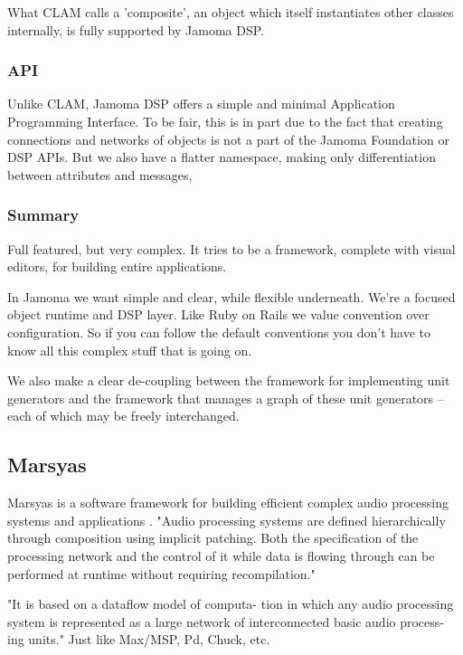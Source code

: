 \documentclass[twoside,10pt]{article}
\begin{document}
What CLAM calls a 'composite', an object which itself instantiates other classes internally, is fully supported by Jamoma DSP.


\subsubsection{API}

Unlike CLAM, Jamoma DSP offers a simple and minimal Application Programming Interface.  To be fair, this is in part due to the fact that creating connections and networks of objects is not a part of the Jamoma Foundation or DSP APIs.  But we also have a flatter namespace, making only differentiation between attributes and messages,


\subsubsection{Summary}

Full featured, but very complex.  It tries to be a framework, complete with visual editors, for building entire applications.

In Jamoma we want simple and clear, while flexible underneath.  We're a focused object runtime and DSP layer.  Like Ruby on Rails we value convention over configuration.  So if you can follow the default conventions you don't have to know all this complex stuff that is going on.

We also make a clear de-coupling between the framework for implementing unit generators and the framework that manages a graph of these unit generators -- each of which may be freely interchanged.


\subsection{Marsyas} %

Marsyas is a software framework for building efficient complex audio processing systems and applications \cite{Tzanetakis:2008}. "Audio processing systems are defined hierarchically through composition using implicit patching. Both the specification of the processing network and the control of it while data is flowing through can be performed at runtime without requiring recompilation."

"It is based on a dataflow model of computa- tion in which any audio processing system is represented as a large network of interconnected basic audio process- ing units."  Just like Max/MSP, Pd, Chuck, etc.
\end{document}
